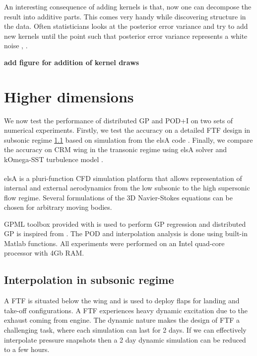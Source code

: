 An interesting consequence of adding kernels is that, now one can decompose the result into additive parts. This comes very handy while discovering structure in the data. Often statisticians  looks at the posterior error variance and try to add new kernels until the point such that posterior error variance represents a white noise \cite{duvenaud2013structure}, \cite{lloyd2014automatic}. 

\textbf{add figure for addition of kernel draws}




\section{Higher dimensions}

We now test the performance of distributed GP and POD+I on two sets of numerical experiments. Firstly, we test the accuracy on a detailed FTF design \cite{Bosco2016} in subsonic regime \ref{subSec:elsAResults} based on simulation from the elsA code \cite{cambier2008status}. Finally, we compare the accuracy on CRM wing in the transonic regime using elsA solver and kOmega-SST turbulence model \cite{vassberg2014summary}. 

elsA\textsuperscript{\textregistered} \cite{cambier2008status} is a pluri-function CFD simulation platform that allows representation of internal and external aerodynamics from the low subsonic to the high supersonic flow regime. Several formulations of the 3D Navier-Stokes equations can be chosen for arbitrary moving bodies. 

GPML toolbox provided with \cite{rasmussen2006gaussian} is used to perform GP regression and distributed GP is inspired from \cite{deisenroth2015distributed}. The POD and interpolation analysis is done using built-in Matlab functions\cite{mathworks2005matlab}. All experiments were performed on an Intel quad-core processor with 4Gb RAM.

\subsection{Interpolation in subsonic regime}\label{subSec:elsAResults}
A FTF is situated below the wing and is used to deploy flaps for landing and take-off configurations. A FTF experiences heavy dynamic excitation due to the exhaust coming from engine. The dynamic nature makes the design of FTF a challenging task, where each simulation can last for 2 days. If we can effectively interpolate pressure snapshots then a 2 day dynamic simulation can be reduced to a few hours. 

